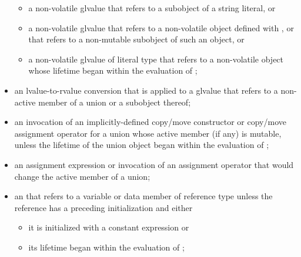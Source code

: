 \begin{itemize}
\begin{itemize}
  \item
  a non-volatile glvalue that refers to a subobject of a string
  literal, or

  \item
  a non-volatile glvalue that refers to a non-volatile object
  defined with , or that refers to a non-mutable subobject
  of such an object, or

  \item
  a non-volatile glvalue of literal type that refers to a non-volatile object
  whose lifetime began within the evaluation of ;
\end{itemize}

\item
an lvalue-to-rvalue conversion
that is applied to a glvalue
that refers to a non-active member of a union or a subobject thereof;

\item
an invocation of an implicitly-defined copy/move constructor or
copy/move assignment operator
for a union whose active member (if any) is mutable,
unless the lifetime of the union object began within the evaluation of ;

\item
an assignment expression
or invocation of an assignment operator
that would change the active member of a union;

\item
an  that refers to a variable or
data member of reference type
unless the reference has a preceding initialization and either

\begin{itemize}
  \item
  it is initialized with a constant expression or

  \item
  its lifetime began within the evaluation of ;
\end{itemize}


\end{itemize}
